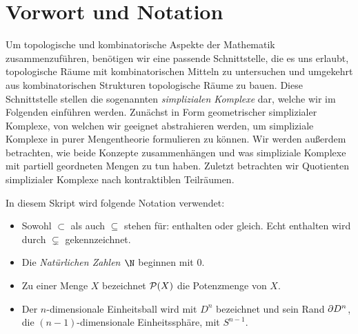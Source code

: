 
\chapter{Vorwort und Notation}
Um topologische und kombinatorische Aspekte der Mathematik zusammenzuführen,
benötigen wir eine passende Schnittstelle, die es uns erlaubt, topologische
Räume mit kombinatorischen Mitteln zu untersuchen und umgekehrt aus
kombinatorischen Strukturen topologische Räume zu bauen. Diese Schnittstelle
stellen die sogenannten \emph{simplizialen Komplexe} dar, welche wir im
Folgenden einführen werden. Zunächst in Form geometrischer simplizialer
Komplexe, von welchen wir geeignet abstrahieren werden, um simpliziale Komplexe
in purer Mengentheorie formulieren zu können. Wir werden außerdem betrachten,
wie beide Konzepte zusammenhängen und was simpliziale Komplexe mit partiell
geordneten Mengen zu tun haben. Zuletzt betrachten wir Quotienten simplizialer
Komplexe nach kontraktiblen Teilräumen.


\bigskip
In diesem Skript wird folgende Notation verwendet:
\begin{itemize}
    \item
        Sowohl $\subset$ als auch $\subseteq$ stehen für: enthalten oder gleich.
        Echt enthalten wird durch $\subsetneq$ gekennzeichnet.
    
    \item
        Die \emph{Natürlichen Zahlen $\N$} beginnen mit $0$.
        
    \item
        Zu einer Menge $X$ bezeichnet $\operatorname{\mathcal{P}}(X)$ die Potenzmenge von $X$.

    \item %
        Der $n$-dimensionale Einheitsball wird mit $D^n$ bezeichnet und
        sein Rand $\partial D^n$, 
        die $(n{-}1)$-dimensionale Einheitssphäre, mit $S^{n-1}$.
\end{itemize}










